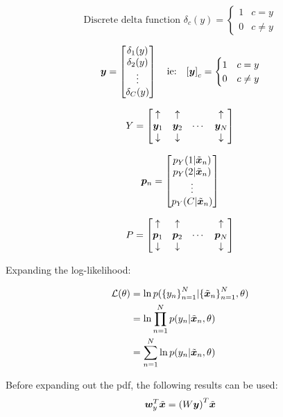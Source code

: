 \documentclass[../../main.tex]{subfiles}
\begin{document}
\[ \textrm{Discrete delta function  } \delta_c(y) =
\begin{cases}
1 & c = y \\
0 & c \neq y
\end{cases}
\]

\[ \bm{y} = \left[\begin{matrix}
    \delta_1(y) \\
    \delta_2(y) \\
    \vdots \\
    \delta_C(y)
\end{matrix}\right]
\quad
\textrm{ie:}\quad {[ \bm{y} ]}_c =
\begin{cases}
1 & c = y \\
0 & c \neq y
\end{cases}
\]

\[ Y = \left[\begin{matrix}
    \uparrow & \uparrow & & \uparrow \\
    \bm{y}_1 & \bm{y}_2 & \cdots & \bm{y}_N \\
    \downarrow & \downarrow & & \downarrow
\end{matrix}\right]\]

\[ \bm{p}_n = \left[\begin{matrix}
        p_Y(1|\tilde{\bm{x}}_n) \\
        p_Y(2|\tilde{\bm{x}}_n) \\
        \vdots \\
        p_Y(C|\tilde{\bm{x}}_n)
\end{matrix}\right]\]

\[ P = \left[\begin{matrix}
    \uparrow & \uparrow & & \uparrow \\
    \bm{p}_1 & \bm{p}_2 & \cdots & \bm{p}_N \\
    \downarrow & \downarrow & & \downarrow
\end{matrix}\right]\]

Expanding the log-likelihood:

\begin{align*}
\mathcal{L}(\theta)
&= \ln p({\{y_n\}}_{n=1}^N|{\{\tilde{\bm{x}}_n\}}_{n=1}^N, \theta) \\
&= \ln \prod_{n=1}^N p(y_n | \tilde{\bm{x}}_n, \theta) \\
&= \sum_{n=1}^N \ln p(y_n | \tilde{\bm{x}}_n, \theta)
\end{align*}

Before expanding out the pdf, the following results can be used:
\[ \bm{w}_y^T\tilde{\bm{x}} = {(W\bm{y})}^T\tilde{\bm{x}}\]
\end{document}
